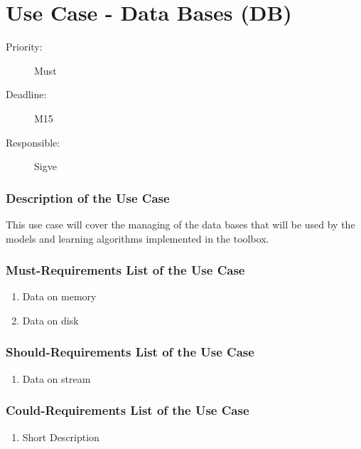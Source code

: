 \newpage
\section{Use Case - Data Bases (DB)}
\label{UseCase:DB}

\begin{description}
\item[Priority:] Must
\item[Deadline:] M15
\item[Responsible:] Sigve
\end{description}

\subsubsection*{Description of the Use Case}

This use case will cover the managing of the data bases that will be used by the models and learning algorithms implemented in the toolbox.  


\subsubsection*{Must-Requirements List of the Use Case}

\begin{enumerate}
\item Data on memory
\item Data on disk
\end{enumerate}

\subsubsection*{Should-Requirements List of the Use Case}

\begin{enumerate}
\item Data on stream
\end{enumerate}

\subsubsection*{Could-Requirements List of the Use Case}

\begin{enumerate}
\item Short Description
\end{enumerate}


